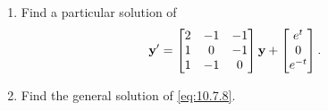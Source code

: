 \documentclass{ximera}
\begin{document}
\begin{example}\label{example:10.7.4} 
\begin{enumerate}
\item\label{item:10.7.4a} %
Find a particular solution of
\begin{equation} \label{eq:10.7.8}
{\bf y}'=\begin{bmatrix}2&-1&-1\\1&0&-1\\1&-1&0\end{bmatrix}{\bf
y}+\begin{bmatrix}e^{t}\\0\\e^{-t}
\end{bmatrix}.
\end{equation}
\item\label{item:10.7.4b} %
Find the general solution of  \eqref{eq:10.7.8}.
\end{enumerate}


\end{example}
\end{document}
